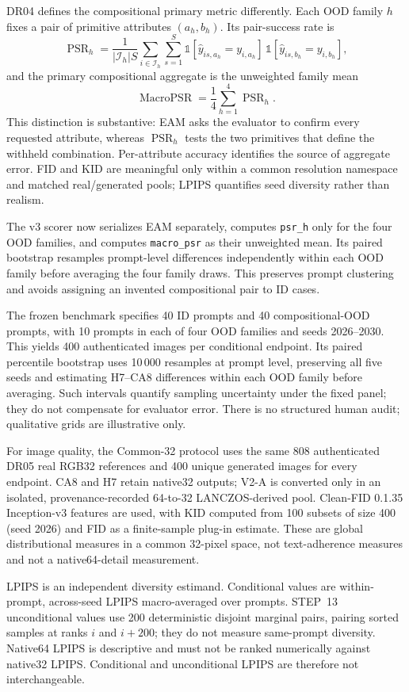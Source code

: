DR04 defines the compositional primary metric differently. Each OOD family $h$ fixes a pair of primitive attributes $(a_h,b_h)$. Its pair-success rate is
\begin{equation}\label{eq:psr-h}
\operatorname{PSR}_h=\frac{1}{|\mathcal{I}_h|S}\sum_{i\in\mathcal{I}_h}\sum_{s=1}^{S}\mathbb{1}[\hat y_{is,a_h}=y_{i,a_h}]\,\mathbb{1}[\hat y_{is,b_h}=y_{i,b_h}],
\end{equation}
and the primary compositional aggregate is the unweighted family mean
\begin{equation}\label{eq:macro-psr}
\operatorname{MacroPSR}=\frac{1}{4}\sum_{h=1}^{4}\operatorname{PSR}_h.
\end{equation}
This distinction is substantive: EAM asks the evaluator to confirm every requested attribute, whereas $\operatorname{PSR}_h$ tests the two primitives that define the withheld combination. Per-attribute accuracy identifies the source of aggregate error. FID \parencite{heusel2017ttur} and KID \parencite{binkowski2018mmd} are meaningful only within a common resolution namespace and matched real/generated pools; LPIPS \parencite{zhang2018lpips} quantifies seed diversity rather than realism.

The v3 scorer now serializes EAM separately, computes \texttt{psr\_h} only for the four OOD families, and computes \texttt{macro\_psr} as their unweighted mean. Its paired bootstrap resamples prompt-level differences independently within each OOD family before averaging the four family draws. This preserves prompt clustering and avoids assigning an invented compositional pair to ID cases.

The frozen benchmark specifies 40 ID prompts and 40 compositional-OOD prompts, with 10 prompts in each of four OOD families and seeds 2026--2030. This yields 400 authenticated images per conditional endpoint. Its paired percentile bootstrap uses 10\,000 resamples at prompt level, preserving all five seeds and estimating H7--CA8 differences within each OOD family before averaging. Such intervals quantify sampling uncertainty under the fixed panel; they do not compensate for evaluator error. There is no structured human audit; qualitative grids are illustrative only.

For image quality, the Common-32 protocol uses the same 808 authenticated DR05 real RGB32 references and 400 unique generated images for every endpoint. CA8 and H7 retain native32 outputs; V2-A is converted only in an isolated, provenance-recorded 64-to-32 LANCZOS-derived pool. Clean-FID 0.1.35 Inception-v3 features are used, with KID computed from 100 subsets of size 400 (seed 2026) and FID as a finite-sample plug-in estimate. These are global distributional measures in a common 32-pixel space, not text-adherence measures and not a native64-detail measurement.

LPIPS is an independent diversity estimand. Conditional values are within-prompt, across-seed LPIPS macro-averaged over prompts. STEP~13 unconditional values use 200 deterministic disjoint marginal pairs, pairing sorted samples at ranks $i$ and $i+200$; they do not measure same-prompt diversity. Native64 LPIPS is descriptive and must not be ranked numerically against native32 LPIPS. Conditional and unconditional LPIPS are therefore not interchangeable.
